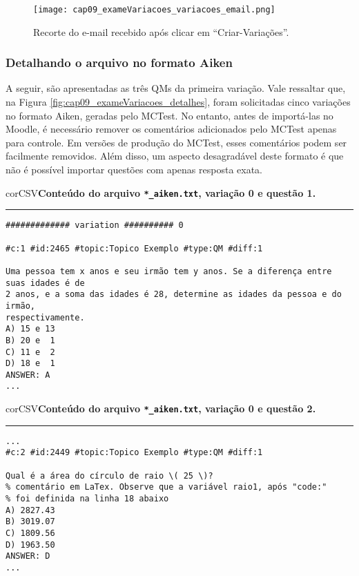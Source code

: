 \begin{figure}[!ht]
\centering
  \texttt{[image: cap09\_exameVariacoes\_variacoes\_email.png]}
  \caption{Recorte do e-mail recebido após clicar em ``Criar-Variações''.}
  \label{fig:cap09_xameVariacoes_variacoes_email}
\end{figure}

\subsubsection{Detalhando o arquivo no formato Aiken}

A seguir, são apresentadas as três QMs da primeira variação. Vale ressaltar que, na Figura \ref{fig:cap09_exameVariacoes_detalhes}, foram solicitadas cinco variações no formato Aiken, geradas pelo MCTest. No entanto, antes de importá-las no Moodle, é necessário remover os comentários adicionados pelo MCTest apenas para controle. Em versões de produção do MCTest, esses comentários podem ser facilmente removidos. Além disso, um aspecto desagradável deste formato é que não é possível importar questões com apenas resposta exata.

\begin{myboxCode}{corCSV}{\textbf{Conteúdo do arquivo \texttt{*\_aiken.txt}, variação 0 e questão 1.}}\vspace{3mm}
\hrule
\begin{verbatim}
############# variation ########## 0

#c:1 #id:2465 #topic:Topico Exemplo #type:QM #diff:1

Uma pessoa tem x anos e seu irmão tem y anos. Se a diferença entre suas idades é de 
2 anos, e a soma das idades é 28, determine as idades da pessoa e do irmão,
respectivamente. 
A) 15 e 13
B) 20 e  1
C) 11 e  2
D) 18 e  1
ANSWER: A
...
\end{verbatim}
\end{myboxCode}

\begin{myboxCode}{corCSV}{\textbf{Conteúdo do arquivo \texttt{*\_aiken.txt}, variação 0 e questão 2.}}\vspace{3mm}
\hrule
\begin{verbatim}
...
#c:2 #id:2449 #topic:Topico Exemplo #type:QM #diff:1

Qual é a área do círculo de raio \( 25 \)?
% comentário em LaTex. Observe que a variável raio1, após "code:" 
% foi definida na linha 18 abaixo
A) 2827.43
B) 3019.07
C) 1809.56
D) 1963.50
ANSWER: D
...
\end{verbatim}
\end{myboxCode}

